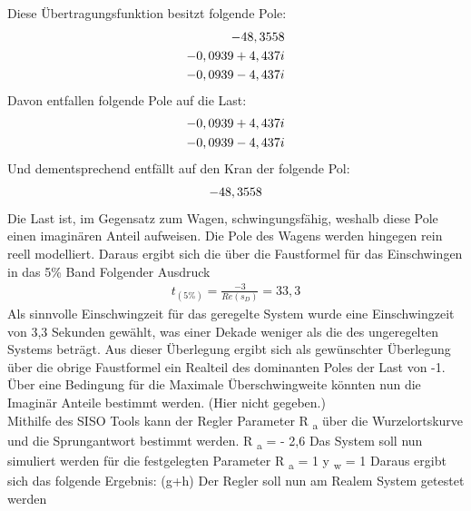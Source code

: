 \documentclass[10pt]{scrartcl}
\begin{document}
Diese Übertragungsfunktion besitzt folgende Pole:
\begin{align}
-48,3558 \notag \\
-0,0939+4,437i  \notag \\
-0,0939-4,437i \notag 
 \end{align} 
Davon entfallen folgende Pole auf die Last: 
\begin{align}
-0,0939+4,437i  \notag \\
-0,0939-4,437i  \notag 
\end{align}
Und dementsprechend entfällt auf den Kran der folgende Pol:
\begin{align}
-48,3558  \notag 
\end{align}
Die Last ist, im Gegensatz zum Wagen, schwingungsfähig, weshalb diese Pole einen imaginären Anteil aufweisen. Die Pole des Wagens werden hingegen rein reell modelliert. 
Daraus ergibt sich die über die Faustformel für das Einschwingen in das 5\% Band Folgender Ausdruck
\begin{align}
t_{(5\%)}=\frac{-3}{Re(s_D)}=33,3
\end{align}
 Als sinnvolle Einschwingzeit für das geregelte System wurde eine Einschwingzeit von  3,3 Sekunden gewählt, was einer Dekade weniger als die des ungeregelten Systems beträgt. Aus dieser Überlegung ergibt sich als gewünschter Überlegung über die obrige Faustformel ein Realteil des dominanten Poles der Last von -1. Über eine Bedingung für die Maximale Überschwingweite könnten nun die Imaginär Anteile bestimmt werden. (Hier nicht gegeben.) \\
Mithilfe des SISO Tools kann der Regler Parameter R \textsubscript{a}
über die Wurzelortskurve und die Sprungantwort bestimmt werden.
R \textsubscript{a} = - 2,6
Das System soll nun simuliert werden für die festgelegten Parameter
R \textsubscript{a} = 1
 y \textsubscript{w} = 1
Daraus ergibt sich das folgende Ergebnis: 
(g+h) Der Regler soll nun am Realem System getestet werden
\end{document}
